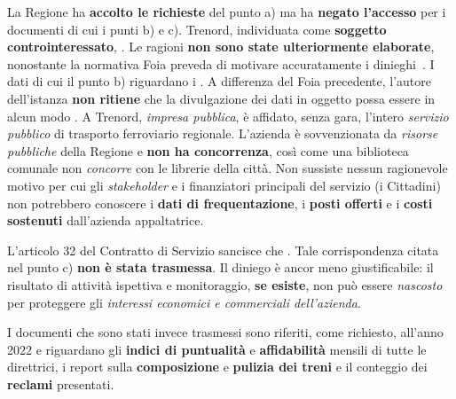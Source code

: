 \documentclass[12pt,italian]{report}
\begin{document}
La Regione ha \textbf{accolto le richieste} del punto a) ma ha
\textbf{negato l'accesso} per i documenti di cui i punti b) e c).
Trenord, individuata come \textbf{soggetto controinteressato},
.  Le ragioni \textbf{non sono state ulteriormente
    elaborate}, nonostante la normativa Foia preveda di motivare
accuratamente i dinieghi~\cite[art.\ 5, comma 6]{Dlgs33}.  I dati di
cui il punto b) riguardano i .  A differenza del Foia precedente, l'autore
dell'istanza \textbf{non ritiene} che la divulgazione dei dati in
oggetto possa essere in alcun modo
.  A Trenord, \textit{impresa
    pubblica}, è affidato, senza gara, l'intero \textit{servizio
    pubblico} di trasporto ferroviario regionale.  L'azienda è
sovvenzionata da \textit{risorse pubbliche} della Regione e
\textbf{non ha concorrenza}, così come una biblioteca comunale non
\textit{concorre} con le librerie della città.  Non sussiste nessun
ragionevole motivo per cui gli \textit{stakeholder} e i finanziatori
principali del servizio (i Cittadini) non potrebbero conoscere i
\textbf{dati di frequentazione}, i \textbf{posti offerti} e i
\textbf{costi sostenuti} dall'azienda appaltatrice.

L'articolo 32 del Contratto di Servizio sancisce che
.  Tale corrispondenza citata nel punto c) \textbf{non
    è stata trasmessa}.  Il diniego è ancor meno giustificabile: il
risultato di attività ispettiva e monitoraggio, \textbf{se esiste},
non può essere \textit{nascosto} per proteggere gli \textit{interessi
    economici e commerciali dell'azienda}.

I documenti che sono stati invece trasmessi sono riferiti, come
richiesto, all'anno 2022 e riguardano gli \textbf{indici di
    puntualità} e \textbf{affidabilità} mensili di tutte le
direttrici, i report sulla \textbf{composizione} e \textbf{pulizia dei
    treni} e il conteggio dei \textbf{reclami} presentati.
\end{document}
